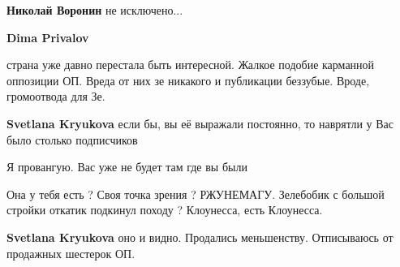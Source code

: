 \begin{itemize}
\begin{itemize}
 
\textbf{Николай Воронин} не исключено...

 
\textbf{Dima Privalov} 

страна уже давно перестала быть интересной. Жалкое подобие карманной оппозиции
ОП. Вреда от них зе никакого и публикации беззубые. Вроде, громоотвода для Зе.

 
\textbf{Svetlana Kryukova} если бы, вы её выражали постоянно, то наврятли у Вас было столько подписчиков

 
Я провангую. Вас уже не будет там где вы были

 
Она у тебя есть ? Своя точка зрения ? РЖУНЕМАГУ. Зелебобик с большой стройки откатик подкинул походу ? Клоунесса, есть Клоунесса.

 
\textbf{Svetlana Kryukova} оно и видно. Продались меньшенству. Отписываюсь от продажных шестерок ОП.

 

\end{itemize}
\end{itemize}
